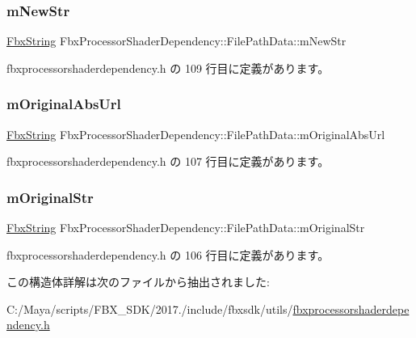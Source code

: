 \subsubsection{\texorpdfstring{m\+New\+Str}{mNewStr}}
{\footnotesize\ttfamily \hyperlink{class_fbx_string}{Fbx\+String} Fbx\+Processor\+Shader\+Dependency\+::\+File\+Path\+Data\+::m\+New\+Str}



 fbxprocessorshaderdependency.\+h の 109 行目に定義があります。

\mbox{\label{struct_fbx_processor_shader_dependency_1_1_file_path_data_a928d771cfe786eb2d62c4d01f4b39e67}} 
\subsubsection{\texorpdfstring{m\+Original\+Abs\+Url}{mOriginalAbsUrl}}
{\footnotesize\ttfamily \hyperlink{class_fbx_string}{Fbx\+String} Fbx\+Processor\+Shader\+Dependency\+::\+File\+Path\+Data\+::m\+Original\+Abs\+Url}



 fbxprocessorshaderdependency.\+h の 107 行目に定義があります。

\mbox{\label{struct_fbx_processor_shader_dependency_1_1_file_path_data_aa8e2a65dd054c34298e4c94e97e25a7d}} 
\subsubsection{\texorpdfstring{m\+Original\+Str}{mOriginalStr}}
{\footnotesize\ttfamily \hyperlink{class_fbx_string}{Fbx\+String} Fbx\+Processor\+Shader\+Dependency\+::\+File\+Path\+Data\+::m\+Original\+Str}



 fbxprocessorshaderdependency.\+h の 106 行目に定義があります。



この構造体詳解は次のファイルから抽出されました\+:\begin{DoxyCompactItemize}
\item 
C\+:/\+Maya/scripts/\+F\+B\+X\+\_\+\+S\+D\+K/2017./include/fbxsdk/utils/\hyperlink{fbxprocessorshaderdependency_8h}{fbxprocessorshaderdependency.\+h}\end{DoxyCompactItemize}
